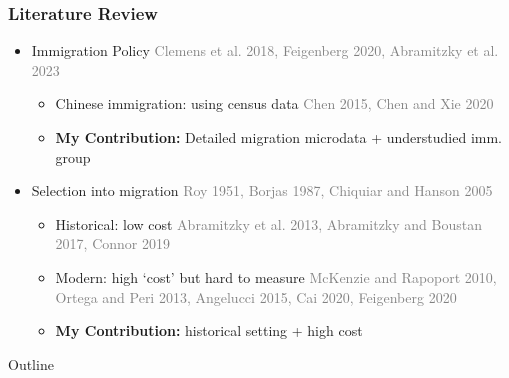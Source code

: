 \documentclass[xcolor=dvipsnames, compress, 12pt, aspectratio=169, handout]{beamer}
\begin{document}
\begin{frame}
    \frametitle{Literature Review}
    \begin{itemize}
        \item Immigration Policy \small \textcolor{gray}{Clemens et al. 2018, Feigenberg 2020, Abramitzky et al. 2023}
        \vspace{2mm}
        \begin{itemize}
            \item Chinese immigration: using census data \footnotesize \textcolor{gray}{Chen 2015, Chen and Xie 2020}
            \vspace{1mm} \small 
            \item \textbf{My Contribution:} Detailed migration microdata + understudied imm. group 
        \end{itemize}
        \vspace{2mm} \normalsize 
        \vspace{2mm} 
        \item Selection into migration \small \textcolor{gray}{Roy 1951, Borjas 1987, Chiquiar and Hanson 2005}
        \vspace{2mm}
        \begin{itemize}
            \item Historical: low cost \footnotesize \textcolor{gray}{Abramitzky et al. 2013, Abramitzky and Boustan 2017, Connor 2019} \vspace{1mm}
            \item \small Modern: high `cost' but hard to measure \footnotesize \textcolor{gray}{McKenzie and Rapoport 2010, Ortega and Peri 2013, Angelucci 2015, Cai 2020, Feigenberg 2020} \vspace{1mm} 
            \item \small \textbf{My Contribution:} historical setting + high cost 
        \end{itemize} \normalsize 
    \end{itemize}
\end{frame}

\begin{frame}[plain]{Outline}
    \tableofcontents
    \addtocounter{framenumber}{-1}
\end{frame}

\end{document}
